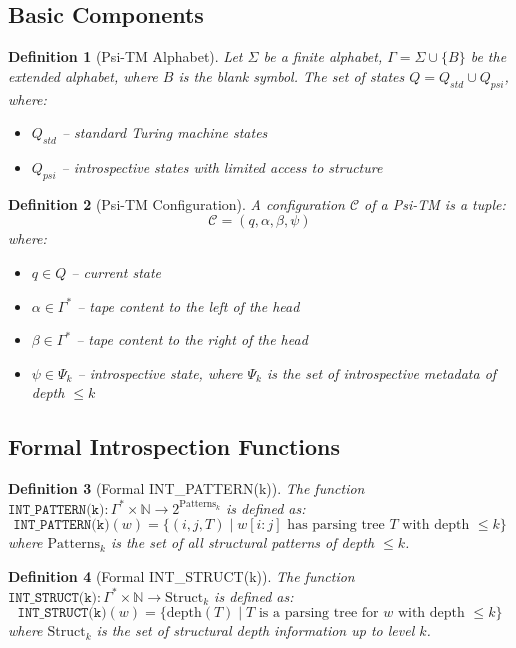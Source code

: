 \documentclass[11pt]{article}
\newtheorem{definition}{Definition}
\begin{document}
\subsection{Basic Components}

\begin{definition}[Psi-TM Alphabet]
Let $\Sigma$ be a finite alphabet, $\Gamma = \Sigma \cup \{B\}$ be the extended alphabet, where $B$ is the blank symbol. The set of states $Q = Q_{std} \cup Q_{psi}$, where:
\begin{itemize}
\item $Q_{std}$ -- standard Turing machine states
\item $Q_{psi}$ -- introspective states with limited access to structure
\end{itemize}
\end{definition}

\begin{definition}[Psi-TM Configuration]
A configuration $\mathcal{C}$ of a Psi-TM is a tuple:
$$\mathcal{C} = (q, \alpha, \beta, \psi)$$
where:
\begin{itemize}
\item $q \in Q$ -- current state
\item $\alpha \in \Gamma^*$ -- tape content to the left of the head
\item $\beta \in \Gamma^*$ -- tape content to the right of the head
\item $\psi \in \Psi_k$ -- introspective state, where $\Psi_k$ is the set of introspective metadata of depth $\leq k$
\end{itemize}
\end{definition}

\subsection{Formal Introspection Functions}

\begin{definition}[Formal INT\_PATTERN(k)]
The function $\texttt{INT\_PATTERN(k)}: \Gamma^* \times \mathbb{N} \to 2^{\text{Patterns}_k}$ is defined as:
$$\texttt{INT\_PATTERN(k)}(w) = \{(i,j,T) \mid w[i:j] \text{ has parsing tree } T \text{ with depth } \leq k\}$$
where $\text{Patterns}_k$ is the set of all structural patterns of depth $\leq k$.
\end{definition}

\begin{definition}[Formal INT\_STRUCT(k)]
The function $\texttt{INT\_STRUCT(k)}: \Gamma^* \times \mathbb{N} \to \text{Struct}_k$ is defined as:
$$\texttt{INT\_STRUCT(k)}(w) = \{\text{depth}(T) \mid T \text{ is a parsing tree for } w \text{ with depth } \leq k\}$$
where $\text{Struct}_k$ is the set of structural depth information up to level $k$.
\end{definition}
\end{document}
